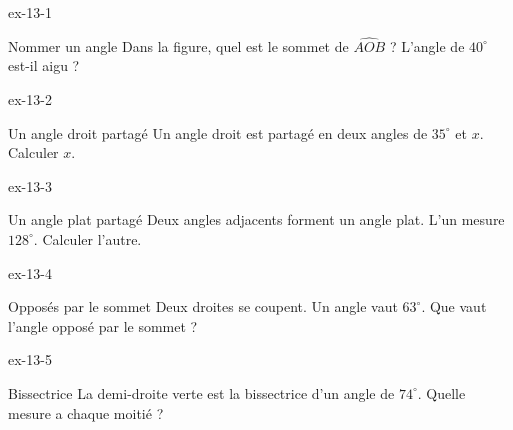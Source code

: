 \clearpage{}
\begin{blocLivre}{ex-13-1}\begin{exercice}[1]{Nommer un angle}
Dans la figure, quel est le sommet de $\widehat{AOB}$ ? L’angle de $40^\circ$ est-il aigu ?
\label{fig-ex-13-1}
\end{exercice}\end{blocLivre}
\begin{blocLivre}{ex-13-2}\begin{exercice}[1]{Un angle droit partagé}
Un angle droit est partagé en deux angles de $35^\circ$ et $x$. Calculer $x$.
\label{fig-ex-13-2}
\end{exercice}\end{blocLivre}
\begin{blocLivre}{ex-13-3}\begin{exercice}[1]{Un angle plat partagé}
Deux angles adjacents forment un angle plat. L’un mesure $128^\circ$. Calculer l’autre.
\label{fig-ex-13-3}
\end{exercice}\end{blocLivre}
\begin{blocLivre}{ex-13-4}\begin{exercice}[1]{Opposés par le sommet}
Deux droites se coupent. Un angle vaut $63^\circ$. Que vaut l’angle opposé par le sommet ?
\label{fig-ex-13-4}
\end{exercice}\end{blocLivre}
\begin{blocLivre}{ex-13-5}\begin{exercice}[1]{Bissectrice}
La demi-droite verte est la bissectrice d’un angle de $74^\circ$. Quelle mesure a chaque moitié ?
\label{fig-ex-13-5}
\end{exercice}\end{blocLivre}

